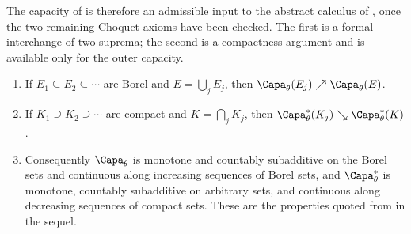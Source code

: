 The capacity of  is therefore an admissible input to
the abstract calculus of , once the two remaining
Choquet axioms have been checked.  The first is a formal interchange of two
suprema; the second is a compactness argument and is available only for the
outer capacity.

\begin{proposition}
\label{prop:ch25-choquet-axioms}
\begin{enumerate}
\item\label{itm:ch25-chq:incr}
 If $E_1\subseteq E_2\subseteq\cdots$ are Borel and
 $E=\bigcup_jE_j$, then
 $\Capa_\theta(E_j)\nearrow\Capa_\theta(E)$.
\item\label{itm:ch25-chq:decr}
 If $K_1\supseteq K_2\supseteq\cdots$ are compact and
 $K=\bigcap_jK_j$, then
 $\Capa^*_\theta(K_j)\searrow\Capa^*_\theta(K)$.
\item\label{itm:ch25-chq:choquet}
 Consequently $\Capa_\theta$ is monotone and countably subadditive on the
 Borel sets and continuous along increasing sequences of Borel sets, and
 $\Capa^*_\theta$ is monotone, countably subadditive on arbitrary sets,
 and continuous along decreasing sequences of compact sets.  These are the
 properties quoted from  in the sequel.
\end{enumerate}
\end{proposition}

